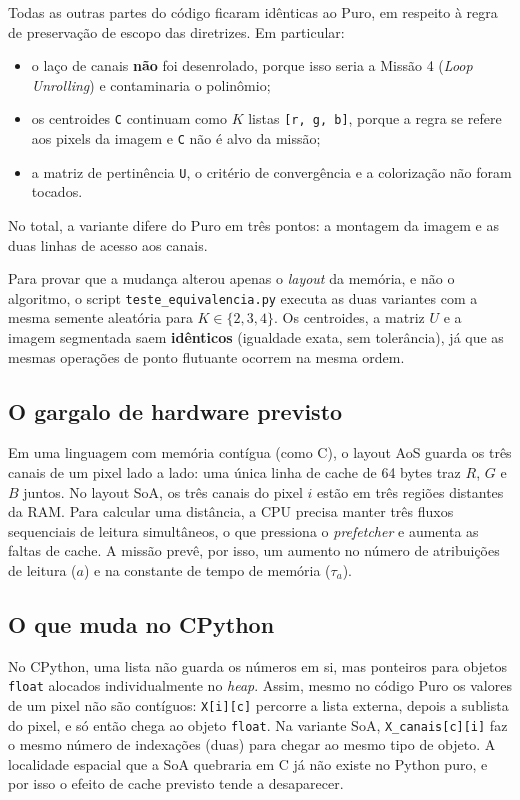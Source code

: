 \documentclass[11pt,a4paper]{article}
\begin{document}
Todas as outras partes do código ficaram idênticas ao Puro, em respeito à regra de preservação de escopo das diretrizes. Em particular:
\begin{itemize}
    \item o laço de canais \textbf{não} foi desenrolado, porque isso seria a Missão 4 (\textit{Loop Unrolling}) e contaminaria o polinômio;
    \item os centroides \texttt{C} continuam como $K$ listas \texttt{[r, g, b]}, porque a regra se refere aos pixels da imagem e \texttt{C} não é alvo da missão;
    \item a matriz de pertinência \texttt{U}, o critério de convergência e a colorização não foram tocados.
\end{itemize}
No total, a variante difere do Puro em três pontos: a montagem da imagem e as duas linhas de acesso aos canais.

Para provar que a mudança alterou apenas o \textit{layout} da memória, e não o algoritmo, o script \texttt{teste\_equivalencia.py} executa as duas variantes com a mesma semente aleatória para $K \in \{2, 3, 4\}$. Os centroides, a matriz $U$ e a imagem segmentada saem \textbf{idênticos} (igualdade exata, sem tolerância), já que as mesmas operações de ponto flutuante ocorrem na mesma ordem.

\subsection{O gargalo de hardware previsto}
Em uma linguagem com memória contígua (como C), o layout AoS guarda os três canais de um pixel lado a lado: uma única linha de cache de 64 bytes traz $R$, $G$ e $B$ juntos. No layout SoA, os três canais do pixel $i$ estão em três regiões distantes da RAM. Para calcular uma distância, a CPU precisa manter três fluxos sequenciais de leitura simultâneos, o que pressiona o \textit{prefetcher} e aumenta as faltas de cache. A missão prevê, por isso, um aumento no número de atribuições de leitura ($a$) e na constante de tempo de memória ($\tau_a$).

\subsection{O que muda no CPython}
No CPython, uma lista não guarda os números em si, mas ponteiros para objetos \texttt{float} alocados individualmente no \textit{heap}. Assim, mesmo no código Puro os valores de um pixel não são contíguos: \texttt{X[i][c]} percorre a lista externa, depois a sublista do pixel, e só então chega ao objeto \texttt{float}. Na variante SoA, \texttt{X\_canais[c][i]} faz o mesmo número de indexações (duas) para chegar ao mesmo tipo de objeto. A localidade espacial que a SoA quebraria em C já não existe no Python puro, e por isso o efeito de cache previsto tende a desaparecer.
\end{document}
